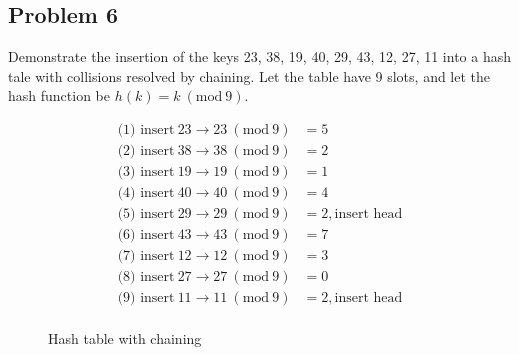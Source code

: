 \documentclass[a4paper]{article}
\def\LinkedList#1{%
  \foreach \element in \list {
     \node[node of list, right = of aux, name=ele] {\element};
     \draw[link] (aux) -- (ele);
     \coordinate (aux) at (ele.east);
  }
}
\newcommand{\Mod}[1]{\ (\mathrm{mod}\ #1)}
\begin{document}
\subsection*{Problem 6}
Demonstrate the insertion of the keys 23, 38, 19, 40, 29, 43, 12, 27, 11 into a hash tale with collisions resolved by chaining. Let the table have 9 slots, and let the hash function be $h(k)=k \Mod{9}$. \\
\begin{minipage}{5cm}
\begin{align*}
  \text{(1) insert}\ 23 \to 23 \Mod{9} &= 5\\
  \text{(2) insert}\ 38 \to 38 \Mod{9} &= 2\\
  \text{(3) insert}\ 19 \to 19 \Mod{9} &= 1\\
  \text{(4) insert}\ 40 \to 40 \Mod{9} &= 4\\
  \text{(5) insert}\ 29 \to 29 \Mod{9} &= 2, \text{insert head}\\
  \text{(6) insert}\ 43 \to 43 \Mod{9} &= 7\\
  \text{(7) insert}\ 12 \to 12 \Mod{9} &= 3\\
  \text{(8) insert}\ 27 \to 27 \Mod{9} &= 0\\
  \text{(9) insert}\ 11 \to 11 \Mod{9} &= 2, \text{insert head}\\
\end{align*}
\end{minipage}
\qquad
\begin{minipage}{8cm}
\begin{figure}[H]
\centering
{}
\caption{Hash table with chaining}
\end{figure}
\end{minipage}

\newpage
\end{document}
